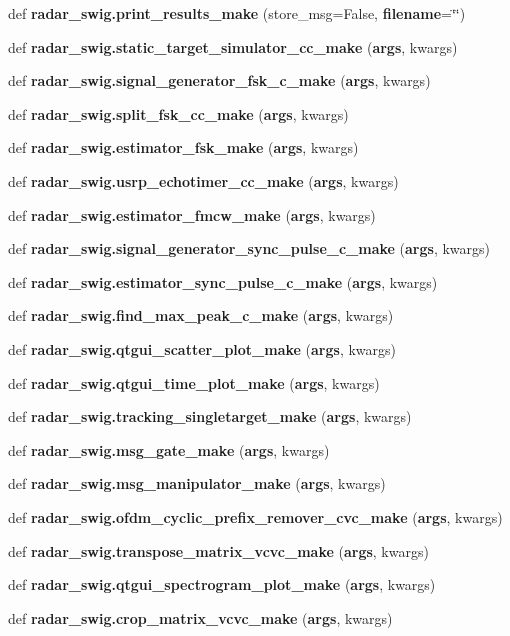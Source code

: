 \begin{DoxyCompactItemize}
\item 
def {\bf radar\+\_\+swig.\+print\+\_\+results\+\_\+make} (store\+\_\+msg=False, {\bf filename}=\char`\"{}\char`\"{})
\item 
def {\bf radar\+\_\+swig.\+static\+\_\+target\+\_\+simulator\+\_\+cc\+\_\+make} ({\bf args}, kwargs)
\item 
def {\bf radar\+\_\+swig.\+signal\+\_\+generator\+\_\+fsk\+\_\+c\+\_\+make} ({\bf args}, kwargs)
\item 
def {\bf radar\+\_\+swig.\+split\+\_\+fsk\+\_\+cc\+\_\+make} ({\bf args}, kwargs)
\item 
def {\bf radar\+\_\+swig.\+estimator\+\_\+fsk\+\_\+make} ({\bf args}, kwargs)
\item 
def {\bf radar\+\_\+swig.\+usrp\+\_\+echotimer\+\_\+cc\+\_\+make} ({\bf args}, kwargs)
\item 
def {\bf radar\+\_\+swig.\+estimator\+\_\+fmcw\+\_\+make} ({\bf args}, kwargs)
\item 
def {\bf radar\+\_\+swig.\+signal\+\_\+generator\+\_\+sync\+\_\+pulse\+\_\+c\+\_\+make} ({\bf args}, kwargs)
\item 
def {\bf radar\+\_\+swig.\+estimator\+\_\+sync\+\_\+pulse\+\_\+c\+\_\+make} ({\bf args}, kwargs)
\item 
def {\bf radar\+\_\+swig.\+find\+\_\+max\+\_\+peak\+\_\+c\+\_\+make} ({\bf args}, kwargs)
\item 
def {\bf radar\+\_\+swig.\+qtgui\+\_\+scatter\+\_\+plot\+\_\+make} ({\bf args}, kwargs)
\item 
def {\bf radar\+\_\+swig.\+qtgui\+\_\+time\+\_\+plot\+\_\+make} ({\bf args}, kwargs)
\item 
def {\bf radar\+\_\+swig.\+tracking\+\_\+singletarget\+\_\+make} ({\bf args}, kwargs)
\item 
def {\bf radar\+\_\+swig.\+msg\+\_\+gate\+\_\+make} ({\bf args}, kwargs)
\item 
def {\bf radar\+\_\+swig.\+msg\+\_\+manipulator\+\_\+make} ({\bf args}, kwargs)
\item 
def {\bf radar\+\_\+swig.\+ofdm\+\_\+cyclic\+\_\+prefix\+\_\+remover\+\_\+cvc\+\_\+make} ({\bf args}, kwargs)
\item 
def {\bf radar\+\_\+swig.\+transpose\+\_\+matrix\+\_\+vcvc\+\_\+make} ({\bf args}, kwargs)
\item 
def {\bf radar\+\_\+swig.\+qtgui\+\_\+spectrogram\+\_\+plot\+\_\+make} ({\bf args}, kwargs)
\item 
def {\bf radar\+\_\+swig.\+crop\+\_\+matrix\+\_\+vcvc\+\_\+make} ({\bf args}, kwargs)

\end{DoxyCompactItemize}
